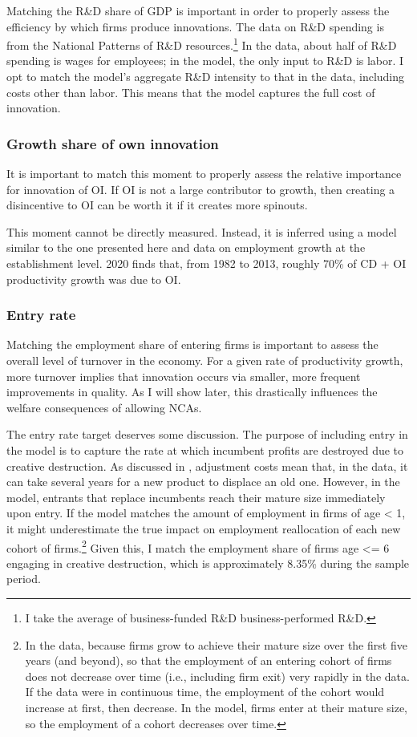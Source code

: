 \documentclass[11pt,english]{article}
\theoremstyle{remark}
\begin{document}
Matching the R\&D share of GDP is important in order to properly assess the efficiency by which firms produce innovations. The data on R\&D spending is from the National Patterns of R\&D resources.\footnote{I take the average of business-funded R\&D business-performed R\&D.} In the data, about half of R\&D spending is wages for employees; in the model, the only input to R\&D is labor. I opt to match the model's aggregate R\&D intensity to that in the data, including costs other than labor. This means that the model captures the full cost of innovation. 

\subsubsection{Growth share of own innovation}

It is important to match this moment to properly assess the relative importance for innovation of OI. If OI is not a large contributor to growth, then creating a disincentive to OI can be worth it if it creates more spinouts. 

This moment cannot be directly measured. Instead, it is inferred using a model similar to the one presented here and data on employment growth at the establishment level. \cite{klenow_innovative_2020} 2020 finds that, from 1982 to 2013, roughly 70\% of CD + OI productivity growth was due to OI. 

\subsubsection{Entry rate}

Matching the employment share of entering firms is important to assess the overall level of turnover in the economy. For a given rate of productivity growth, more turnover implies that innovation occurs via smaller, more frequent improvements in quality. As I will show later, this drastically influences the welfare consequences of allowing NCAs.

The entry rate target deserves some discussion. The purpose of including entry in the model is to capture the rate at which incumbent profits are destroyed due to creative destruction. As discussed in \cite{klenow_innovative_2020}, adjustment costs mean that, in the data, it can take several years for a new product to displace an old one. However, in the model, entrants that replace incumbents reach their mature size immediately upon entry. If the model matches the amount of employment in firms of age < 1, it might underestimate the true impact on employment reallocation of each new cohort of firms.\footnote{In the data, because firms grow to achieve their mature size over the first five years (and beyond), so that the employment of an entering cohort of firms does not decrease over time (i.e., including firm exit) very rapidly in the data. If the data were in continuous time, the employment of the cohort would increase at first, then decrease. In the model, firms enter at their mature size, so the employment of a cohort decreases over time.} Given this, I match the employment share of firms age <= 6 engaging in creative destruction, which is approximately 8.35\% during the sample period.
 
\end{document}
